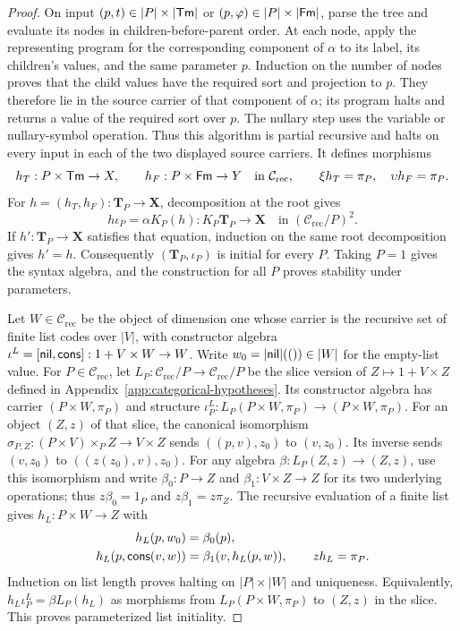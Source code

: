 \begin{proof}
On input $(p,t)\in|P|\times|\mathsf{Tm}|$ or
$(p,\varphi)\in|P|\times|\mathsf{Fm}|$, parse the tree and evaluate its
nodes in children-before-parent order. At each node, apply the
representing program for the corresponding component of $\alpha$
to its label, its children's values, and the same parameter $p$.
Induction on the number of nodes proves that the child values
have the required sort and projection to $p$. They therefore lie
in the source carrier of that component of $\alpha$; its program
halts and returns a value of the required sort over $p$.
The nullary step uses the variable or nullary-symbol operation.
Thus this algorithm is partial recursive and halts on every input
in each of the two displayed source carriers. It defines morphisms
\[
 h_T:P\times\mathsf{Tm}\to X,\qquad h_F:P\times\mathsf{Fm}\to Y
 \quad\text{in }\mathcal C_{\mathrm{rec}},
 \qquad \xi h_T=\pi_P,\quad\upsilon h_F=\pi_P.
\]
For $h=(h_T,h_F):\mathbf T_P\to\mathbf X$, decomposition at
the root gives
\[
 h\iota_P=\alpha K_P(h):K_P\mathbf T_P\to\mathbf X
 \quad\text{in }(\mathcal C_{\mathrm{rec}}/P)^2.
\]
If $h':\mathbf T_P\to\mathbf X$ satisfies that equation,
induction on the same root decomposition gives $h'=h$.
Consequently $(\mathbf T_P,\iota_P)$ is initial for every $P$.
Taking $P=1$ gives the syntax algebra, and the construction for
all $P$ proves stability under parameters.

Let $W\in\mathcal C_{\mathrm{rec}}$ be the object of dimension
one whose carrier is the recursive set of finite list codes over $|V|$, with constructor algebra
$\iota^L=[\mathsf{nil},\mathsf{cons}]:1+V\times W\to W$.
Write $w_0=|\mathsf{nil}|(())\in|W|$ for the empty-list value.
For $P\in\mathcal C_{\mathrm{rec}}$, let
$L_P:\mathcal C_{\mathrm{rec}}/P\to\mathcal C_{\mathrm{rec}}/P$
be the slice version of $Z\mapsto1+V\times Z$ defined in
Appendix~\ref{app:categorical-hypotheses}.
Its constructor algebra has carrier $(P\times W,\pi_P)$ and
structure $\iota^L_P:L_P(P\times W,\pi_P)\to(P\times W,\pi_P)$.
For an object $(Z,z)$ of that slice, the canonical isomorphism
$\sigma_{P,Z}:(P\times V)\times_P Z\to V\times Z$
sends $((p,v),z_0)$ to $(v,z_0)$. Its inverse sends $(v,z_0)$
to $((z(z_0),v),z_0)$. For any algebra
$\beta:L_P(Z,z)\to(Z,z)$, use this isomorphism and write
$\beta_0:P\to Z$ and $\beta_1:V\times Z\to Z$ for its
two underlying operations; thus $z\beta_0=1_P$ and
$z\beta_1=z\pi_Z$.
The recursive evaluation of a finite list gives
$h_L:P\times W\to Z$ with
\[
 \begin{aligned}
 h_L(p,w_0)&=\beta_0(p),\\
 h_L(p,\mathsf{cons}(v,w))&=\beta_1(v,h_L(p,w)),\qquad
 zh_L=\pi_P.
 \end{aligned}
\]
Induction on list length proves halting on $|P|\times|W|$ and
uniqueness. Equivalently,
$h_L\iota^L_P=\beta L_P(h_L)$ as morphisms from
$L_P(P\times W,\pi_P)$ to $(Z,z)$ in the slice.
This proves parameterized list initiality.


\end{proof}
